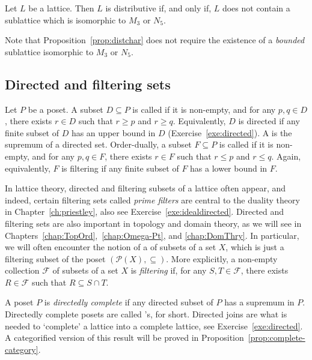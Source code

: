 \begin{proposition}\label{prop:distchar}
Let $L$ be a lattice. Then $L$ is distributive if, and only if, $L$ does not contain a sublattice which is isomorphic to $M_3$ or $N_5$.
\end{proposition}
Note that Proposition~\ref{prop:distchar} does not require the existence of a \emph{bounded} sublattice isomorphic to $M_3$ or $N_5$. %

\subsection*{Directed and filtering sets}
\label{def:directed} Let $P$ be a poset. A subset $D \subseteq P$ is called  if it is non-empty, and for any $p, q \in D$, there exists $r \in D$ such that $r \geq p$ and $r \geq q$.
 Equivalently, $D$ is directed if any finite subset of $D$ has an upper bound in $D$ (Exercise~\ref{exe:directed}).  A  is the supremum of a directed set.
 Order-dually, a subset $F \subseteq P$ is called  if it is non-empty, and for any $p, q \in F$, there exists $r \in F$ such that $r \leq p$ and $r \leq q$.
 Again, equivalently, $F$ is filtering if any finite subset of $F$ has a lower bound in $F$.


In lattice theory, directed and filtering subsets of a lattice often appear, and indeed, certain filtering sets called \emph{prime filters} are central to the duality theory in Chapter~\ref{ch:priestley}, also see Exercise~\ref{exe:idealdirected}.  Directed and filtering sets are also important in topology and domain theory, as we will see in Chapters~\ref{chap:TopOrd},~\ref{chap:Omega-Pt}, and \ref{chap:DomThry}. In particular, we will often encounter the notion of a  of subsets of a set $X$, which is just a filtering subset of the poset $(\mathcal{P}(X), \subseteq)$. More explicitly, a non-empty collection $\mathcal{F}$ of subsets of a set $X$ is \emph{filtering} if, for any $S, T \in \mathcal{F}$, there exists $R \in \mathcal{F}$ such that $R \subseteq S \cap T$.

 
 A poset $P$ is \emph{directedly complete}  if any directed subset of $P$ has a supremum in $P$. Directedly complete posets are called 's, for short. Directed joins are what is needed to `complete' a lattice into a complete lattice, see Exercise~\ref{exe:directed}. A categorified version of this result will be proved in Proposition~\ref{prop:complete-category}.


